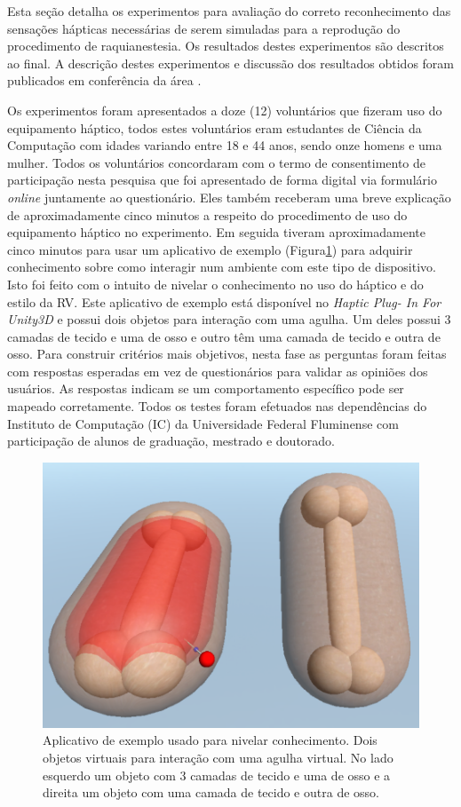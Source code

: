 Esta seção detalha os experimentos para avaliação do correto reconhecimento das sensações hápticas necessárias de serem simuladas para a reprodução do procedimento de raquianestesia. Os resultados destes experimentos são descritos ao final. A descrição destes experimentos e discussão dos resultados obtidos foram publicados em conferência da área \cite{Melo2021}. 

Os experimentos foram apresentados a doze (12) voluntários que fizeram uso do equipamento háptico, todos estes voluntários eram estudantes de Ciência da Computação com idades variando entre 18 e 44 anos, sendo onze homens e uma mulher. Todos os voluntários concordaram com o termo de consentimento de participação nesta pesquisa que foi apresentado de forma digital via formulário \textit{online} juntamente ao questionário. Eles também receberam uma breve explicação de aproximadamente cinco minutos a respeito do procedimento de uso do equipamento háptico no experimento. Em seguida tiveram aproximadamente cinco minutos para usar um aplicativo de exemplo (Figura\ref{fig:aplicativoExemplo}) para adquirir conhecimento sobre como interagir num ambiente com este tipo de dispositivo. Isto foi feito com o intuito de nivelar o conhecimento no uso do háptico e do estilo da \acrshort{RV}. Este aplicativo de exemplo está disponível no \textit{Haptic Plug-
In For Unity3D} \cite{Poyade2014} e possui dois objetos para interação com uma agulha. Um deles possui 3 camadas de tecido e uma de osso e outro têm uma camada de tecido e outra de osso. Para construir critérios mais objetivos, nesta fase as perguntas foram feitas com respostas esperadas em vez de questionários para validar as opiniões dos usuários. As respostas indicam se um comportamento específico pode ser mapeado corretamente.
Todos os testes foram efetuados
nas dependências do Instituto de Computação (IC) da Universidade Federal Fluminense com participação de alunos de graduação, mestrado e doutorado.

\begin{figure}[ht!]
    \centering
    \includegraphics[width=0.6\linewidth]{capitulos/figuras/aplicativo-exemplo.png} 
    \caption{Aplicativo de exemplo usado para nivelar conhecimento. Dois objetos virtuais para interação com uma agulha virtual. No lado esquerdo um objeto com 3 camadas de tecido e uma de osso e a direita um objeto com uma camada de tecido e outra de osso.}
    \label{fig:aplicativoExemplo}
\end{figure}



